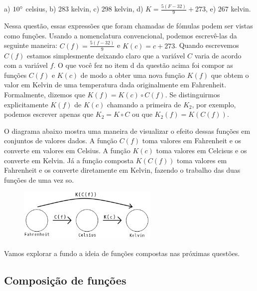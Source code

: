 \documentclass[main.tex]{subfiles}
\begin{document}

\begin{gabarito}
	\begin{gabaritoQuestao}
		a) $10\degree$ celsius, b) $283$ kelvin, c) $298$ kelvin, d) $K=\frac{5(F-32)}{9}+273$, e) $267$ kelvin.
	\end{gabaritoQuestao}
\end{gabarito}

Nessa questão, essas expressões que foram chamadas de fómulas podem ser vistas como funções. Usando a nomenclatura convencional, podemos escrevê-las da seguinte maneira: $C(f)=\frac{5(f-32)}{9}$ e $K(c)=c+273$. Quando escrevemos $C(f)$ estamos simplesmente deixando claro que a variável $C$ varia de acordo com a variável $f$. O que você fez no item d da questão acima foi compor as funções $C(f)$ e $K(c)$ de modo a obter uma nova função $K(f)$ que obtem o valor em Kelvin de uma temperatura dada originalmente em Fahrenheit.
Formalmente, dizemos que $K(f) = K(c) \circ C(f)$. Se distinguirmos explicitamente $K(f)$ de $K(c)$ chamando a primeira de $K_2$, por exemplo, podemos escrever apenas que $K_2=K \circ C$ ou que $K_2(f) = K(C(f))$.

O diagrama abaixo mostra uma maneira de visualizar o efeito dessas funções em conjuntos de valores dados. A função $C(f)$ toma valores em Fahrenheit e os converte em valores em Celsius. A função $K(c)$ toma valores em Celcisus e os converte em Kelvin. Já a função composta $K(C(f))$ toma valores em Fahrenheit e os converte diretamente em Kelvin, fazendo o trabalho das duas funções de uma vez so.

\begin{figure}[h]
\centering
\includegraphics[width=0.6\textwidth]{./img/c5q5.png}
\end{figure}

Vamos explorar a fundo a ideia de funções compostas nas próximas questões.

\subsection*{Composição de funções}
\end{document}
